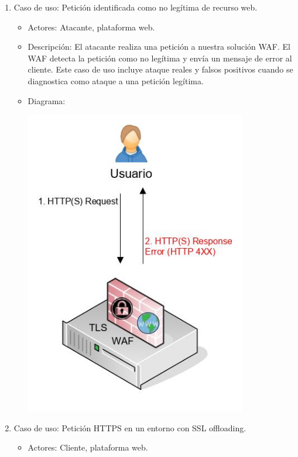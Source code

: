 \begin{enumerate}
\begin{itemize}
\begin{center}
        \end{center}
    \end{itemize}
  \item Caso de uso: Petición identificada como no legítima de recurso web.
    \begin{itemize}
      \item Actores: \Gls{Atacante}, plataforma web.
      \item Descripción: El atacante realiza una petición a nuestra solución WAF. El WAF detecta la petición como no legítima y envía un mensaje de
        error al cliente. Este caso de uso incluye ataque reales y falsos positivos cuando se diagnostica como ataque a una petición legítima.
      \item Diagrama:
        \begin{center}
          \label{fig:CasoUsoX}
          \includegraphics[width=0.8\textwidth]{fig/UseCase2}
        \end{center}
    \end{itemize}
  \item Caso de uso: Petición HTTPS en un entorno con SSL offloading.
    \begin{itemize}
      \item Actores: Cliente, plataforma web.

\end{itemize}
\end{enumerate}
